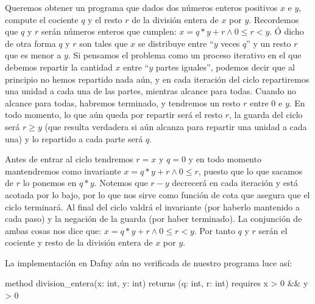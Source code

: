 \documentclass[12pt, a4paper, openany, fleqn]{book}
\begin{document}
    Queremos obtener un programa que dados dos números enteros positivos $x$ e $y$, compute el cociente $q$ y el resto $r$ de la división entera de $x$ por $y$.
    Recordemos que $q$ y $r$ serán números enteros que cumplen:
    $x = q * y + r \land 0 \leqslant r < y$.
    Ó dicho de otra forma $q$ y $r$ son tales que $x$ se distribuye entre ``$y$ veces $q$'' y un resto $r$ que es menor a $y$.
    Si pensamos el problema como un proceso iterativo en el que debemos repartir la cantidad $x$ entre ``$y$ partes iguales'', podemos decir que al principio no hemos repartido nada aún, y en cada iteración del ciclo repartiremos una unidad a cada una de las partes, mientras alcance para todas. Cuando no alcance para todas, habremos terminado, y tendremos un resto $r$ entre 0 e $y$. En todo momento, lo que aún queda por repartir será el resto $r$, la guarda del ciclo será $r \geqslant y$ (que resulta verdadera si aún alcanza para repartir una unidad a cada una) y lo repartido a cada parte será $q$.

    Antes de entrar al ciclo tendremos $r=x$ y $q=0$ y en todo momento mantendremos como invariante $x = q * y + r \land 0 \leqslant r$, puesto que lo que sacamos de $r$ lo ponemos en $q * y$. Notemos que $r - y$ decrecerá en cada iteración y está acotada por lo bajo, por lo que nos sirve como función de cota que asegura que el ciclo terminará.
    Al final del ciclo valdrá el invariante (por haberlo mantenido a cada paso) y la negación de la guarda (por haber terminado). La conjunción de ambas cosas nos dice que: $x = q * y + r \land 0 \leqslant r < y$. Por tanto $q$ y $r$ serán el cociente y resto de la división entera de $x$ por $y$.

    La implementación en Dafny aún no verificada de nuestro programa luce así:
    \vspace{1em}
    \begin{whitebox}
    \begin{dafny}[gobble=8]
        method division_entera(x: int, y: int) returns (q: int, r: int)
            requires x > 0 && y > 0
    \end{dafny}
    \end{whitebox}

    \begin{redbox}
    \begin{dafny}[gobble=8,firstnumber=3]
            ensures x == q * y + r && 0 <= r < y
        {
    \end{dafny}
    \end{redbox}
\end{document}
